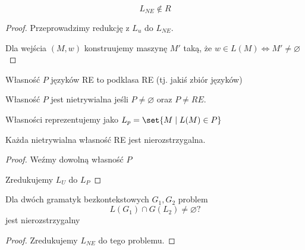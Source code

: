 \begin{lemma}
    \[ L_{NE} \notin R \]
\end{lemma}
\begin{proof}
    Przeprowadzimy redukcję z \( L_u\) do \( L_{NE} \).
    
    Dla wejścia \( (M, w) \) konstruujemy maszynę \( M' \) taką, że
    \( w \in L(M) \iff M' \neq \varnothing \)
\end{proof}

\begin{definition}
    Własność \( P \) języków RE to podklasa RE (tj. jakiś zbiór języków)
    
    Własność \( P \) jest nietrywialna jeśli \( P \neq \varnothing \) oraz \( P \neq RE \).
    
    Własności reprezentujemy jako \( L_p = \set{M \mid L(M) \in P} \)
\end{definition}

\begin{theorem}[Rice]
    Każda nietrywialna własność RE jest nierozstrzygalna.
\end{theorem}
\begin{proof}
    Weźmy dowolną własność \( P \)

    Zredukujemy \( L_U \) do \( L_P \)
    
    
\end{proof}

\begin{lemma}
    Dla dwóch gramatyk bezkontekstowych \( G_1, G_2 \) problem 
    \[
        L(G_1) \cap G(L_2) \neq \varnothing ?
    \]
    jest nierozstrzygalny
\end{lemma}
\begin{proof}
    Zredukujemy \( L_{NE} \) do tego problemu.
\end{proof}